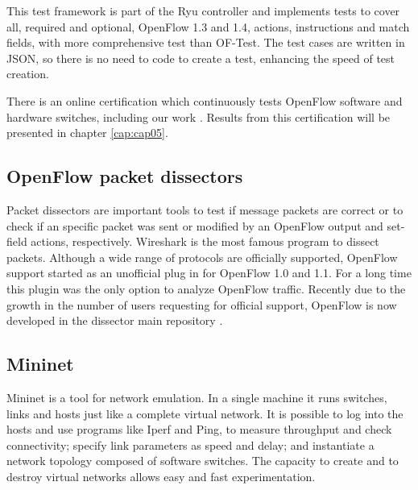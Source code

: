     This test framework is part of the Ryu controller and implements tests to cover all, required and optional, OpenFlow 1.3 and 1.4, actions, instructions and match fields, with more comprehensive test than OF-Test. The test cases are written in JSON, so there is no need to code to create a test, enhancing the speed of test creation. 
    
    There is an online certification which continuously tests OpenFlow software and hardware switches, including our work \cite{ryucert}. Results from this certification will be presented in chapter \ref{cap:cap05}.

    \subsection{OpenFlow packet dissectors}

    Packet dissectors are important tools to test if message packets are correct or to check if an specific packet was sent or modified by an OpenFlow output and set-field actions, respectively. Wireshark \cite{wireof} is the most famous program to dissect packets. Although a wide range of protocols are officially supported, OpenFlow support started as an  unofficial  plug in for OpenFlow 1.0 and 1.1. For a long time this plugin was the only option to analyze OpenFlow traffic. Recently due to the growth in the number of users requesting for official support, OpenFlow is now developed in the dissector main repository \cite{wireof}.    
    \subsection{Mininet}
    
   Mininet \cite{Lantz:2010:NLR:1868447.1868466} is a tool for network emulation. In a single machine it runs switches, links and hosts just like a complete virtual network. It is possible to log into the hosts and use programs like Iperf \cite{iperf} and Ping, to measure throughput and check connectivity; specify link parameters as speed and delay; and instantiate a network topology composed of software switches. The capacity to create and to destroy virtual networks allows easy and fast experimentation. 
  
    